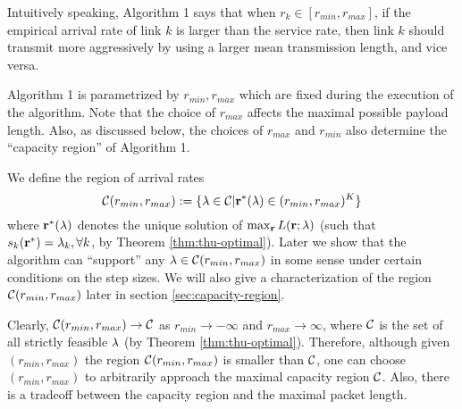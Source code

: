 \documentclass{IEEEtran}
\begin{document}
Intuitively speaking, Algorithm 1 says that when $r_{k}\in[r_{min},r_{max}]$,
if the empirical arrival rate of link $k$ is larger than the service
rate, then link $k$ should transmit more aggressively by using a
larger mean transmission length, and vice versa. 

Algorithm 1 is parametrized by $r_{min},r_{max}$ which are fixed
during the execution of the algorithm. Note that the choice of $r_{max}$
affects the maximal possible payload length. Also, as discussed below,
the choices of $r_{max}$ and $r_{min}$ also determine the {}``capacity
region'' of Algorithm 1.

We define the region of arrival rates\begin{equation}
{\cal C}(r_{min},r_{max}):=\{{\bf \lambda}\in{\cal C}|{\bf r}^{*}({\bf \lambda})\in(r_{min},r_{max})^{K}\}\label{eq:C_min_max}\end{equation}
where ${\bf r}^{*}({\bf \lambda})$ denotes the unique solution of
$\max_{{\bf r}}L({\bf r};{\bf \lambda})$ (such that $s_{k}({\bf r}^{*})=\lambda_{k},\forall k$,
by Theorem \ref{thm:thu-optimal}). Later we show that the algorithm
can {}``support'' any ${\bf \lambda}\in{\cal C}(r_{min},r_{max})$
in some sense under certain conditions on the step sizes. We will
also give a characterization of the region ${\cal C}(r_{min},r_{max})$
later in section \ref{sec:capacity-region}.

Clearly, ${\cal C}(r_{min},r_{max})\rightarrow{\cal C}$ as $r_{min}\rightarrow-\infty$
and $r_{max}\rightarrow\infty$, where ${\cal C}$ is the set of all
strictly feasible ${\bf \lambda}$ (by Theorem \ref{thm:thu-optimal}).
Therefore, although given $(r_{min},r_{max})$ the region ${\cal C}(r_{min},r_{max})$
is smaller than ${\cal C}$, one can choose $(r_{min},r_{max})$ to
arbitrarily approach the maximal capacity region ${\cal C}$. Also,
there is a tradeoff between the capacity region and the maximal packet
length.

\medskip{}
\end{document}
